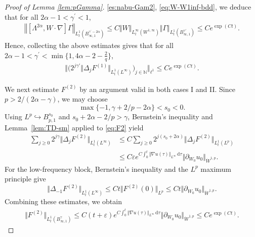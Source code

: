 \documentclass[reqno,11pt,a4paper]{amsart}
\newcommand{\dd}{\mathrm{d}}
\begin{document}
\begin{proof}[Proof of Lemma \ref{lem:pGamma}]
\eqref{es:nabu-Gam2}, \eqref{eq:W-W1inf-bdd}, 
we deduce that for all $2\alpha-1<\gamma^{\prime}<1$,
\begin{align*}
  \left\Vert \left[\Lambda^{2\alpha}, W \cdot \nabla\right] \Gamma\right\Vert _{L^1_t(B_{\infty, 1}^{\gamma^{\prime}-2\alpha})}
  \leq C \Vert  W\Vert _{L^\infty_t(W^{1,\infty})} \Vert \Gamma\Vert _{L^1_t(B_{\infty, 1}^{\gamma'})} 
  \leq C e^{\exp(Ct)}.
\end{align*}
Hence, collecting the above estimates gives that for all $2\alpha-1<\gamma^{\prime}< \min\{1,4\alpha-2-\frac{2}{q}\}$,
\begin{align*}
  \big\Vert  \big( 2^{j\gamma'} \Vert \Delta_j F^{(1)}\Vert _{L^1_t(L^\infty)} \big)_{j\in\mathbb{N}} \big\Vert _{\ell^1}
  \leq C e^{\exp(Ct)}.
\end{align*}

We next estimate $F^{(2)}$ by an argument valid
in both cases I and II.
Since $p>2/(2\alpha-\gamma)$, we may choose
\[
  \max\{-1,\gamma+2/p-2\alpha\}<s_0<0.
\]
Using
$L^p\hookrightarrow B^{s_0}_{p,1}$ and
$s_0+2\alpha-2/p>\gamma$,
Bernstein's inequality and Lemma~\ref{lem:TD-sm}
applied to \eqref{eq:F2} yield
\begin{align*}
  \sum_{j\geq0}2^{j\gamma}
    \Vert \Delta_jF^{(2)}\Vert _{L^1_t(L^\infty)}
  &\leq
  C\sum_{j\geq0}2^{j(s_0+2\alpha)}
    \Vert \Delta_jF^{(2)}\Vert _{L^1_t(L^p)}
  \\
  &\leq
  C\varepsilon
  e^{C\int_0^t\Vert \nabla u(\tau)\Vert _{L^\infty}\,\dd\tau}
  \Vert \partial_{W_0}u_0\Vert _{\dot W^{1,p}}.
\end{align*}
For the low-frequency block, Bernstein's inequality
and the $L^p$ maximum principle give
\[
  \Vert \Delta_{-1}F^{(2)}\Vert _{L^1_t(L^\infty)}
  \leq Ct\Vert F^{(2)}(0)\Vert _{L^p}
  \leq Ct\Vert \partial_{W_0}u_0\Vert _{\dot W^{1,p}}.
\]
Combining these estimates, we obtain
\begin{equation}\label{eq:F2-unified}
\begin{aligned}
  \Vert F^{(2)}\Vert _{L^1_t(B^\gamma_{\infty,1})}
  \leq C(t+\varepsilon)
  e^{C\int_0^t\Vert \nabla u(\tau)\Vert _{L^\infty}\,\dd\tau}
  \Vert \partial_{W_0}u_0\Vert _{\dot W^{1,p}}
  \leq Ce^{\exp(Ct)}.
\end{aligned}
\end{equation}

\end{proof}
\end{document}
